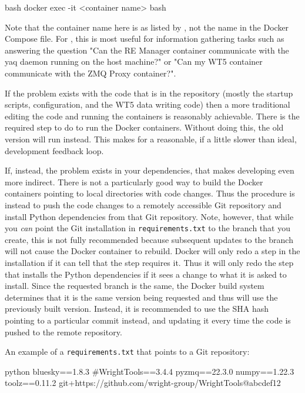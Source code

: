 \begin{codefragment}{bash}
docker exec -it <container name> bash
\end{codefragment}

Note that the container name here is as listed by , not the name in the Docker Compose file.
For \biab, this is most useful for information gathering tasks such as answering the question "Can the RE Manager container communicate with the yaq daemon running on the host machine?" or "Can my WT5 container communicate with the ZMQ Proxy container?".

If the problem exists with the code that is in the \biab repository (mostly the startup scripts, configuration, and the WT5 data writing code) then a more traditional editing the code and running the containers is reasonably achievable.
There is the required step to do  to run the Docker containers.
Without doing this, the old version will run instead.
This makes for a reasonable, if a little slower than ideal, development feedback loop.

If, instead, the problem exists in your dependencies, that makes developing even more indirect.
There is not a particularly good way to build the Docker containers pointing to local directories with code changes.
Thus the procedure is instead to push the code changes to a remotely accessible Git repository and install Python dependencies from that Git repository.
Note, however, that while you \textit{can} point the Git installation in \texttt{requirements.txt} to the branch that you create, this is not fully recommended because subsequent updates to the branch will not cause the Docker container to rebuild.
Docker will only redo a step in the installation if it can tell that the step requires it.
Thus it will only redo the step that installs the Python dependencies if it sees a change to what it is asked to install.
Since the requested branch is the same, the Docker build system determines that it is the same version being requested and thus will use the previously built version.
Instead, it is recommended to use the SHA hash pointing to a particular commit instead, and updating it every time the code is pushed to the remote repository.

An example of a \texttt{requirements.txt} that points to a Git repository:

\begin{codefragment}{python}
bluesky==1.8.3
#WrightTools==3.4.4
pyzmq==22.3.0
numpy==1.22.3
toolz==0.11.2
git+https://github.com/wright-group/WrightTools@abcdef12
\end{codefragment}

